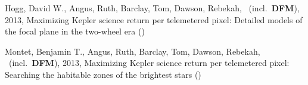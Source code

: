 \item[{\color{numcolor}\scriptsize2}] Hogg, David W., Angus, Ruth, Barclay, Tom, Dawson, Rebekah, \etal\ (incl.\ \textbf{DFM}), 2013, Maximizing Kepler science return per telemetered pixel: Detailed models of the focal plane in the two-wheel era ()

\item[{\color{numcolor}\scriptsize1}] Montet, Benjamin T., Angus, Ruth, Barclay, Tom, Dawson, Rebekah, \etal\ (incl.\ \textbf{DFM}), 2013, Maximizing Kepler science return per telemetered pixel: Searching the habitable zones of the brightest stars ()